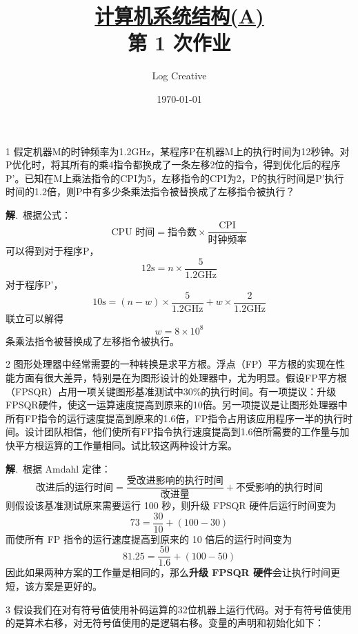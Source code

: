 \documentclass[12pt,a4paper]{article}
\newenvironment{problems}{\begin{list}{}{\renewcommand{\makelabel}[1]{\textbf{##1}.\hfil}}}{\end{list}}
\providecommand{\sol}{\textbf{解}.~}
\begin{document}
\title{\normalsize \underline{计算机系统结构(A)}\\\LARGE 第 1 次作业}
\author{Log Creative }
\date{\today}
\maketitle

\begin{problems}
    \item[1] 假定机器M的时钟频率为1.2GHz，某程序P在机器M上的执行时间为12秒钟。对P优化时，将其所有的乘4指令都换成了一条左移2位的指令，得到优化后的程序P'。已知在M上乘法指令的CPI为5，左移指令的CPI为2，P的执行时间是P'执行时间的1.2倍，则P中有多少条乘法指令被替换成了左移指令被执行？
     
    \sol 根据公式：
    \begin{equation*}
        \text{CPU 时间} = \text{指令数}\times\frac{\text{CPI}}{\text{时钟频率}}
    \end{equation*}
    可以得到对于程序P，
    \begin{equation*}
        12\text{s} = n \times \frac{5}{\text{1.2GHz}}
    \end{equation*}
    对于程序P'，
    \begin{equation*}
        10\text{s} = (n - w) \times \frac{5}{\text{1.2GHz}} + w\times \frac{2}{\text{1.2GHz}}
    \end{equation*}
    联立可以解得
    \begin{equation*}
        w = 8\times 10^8
    \end{equation*}
    条乘法指令被替换成了左移指令被执行。
    \item[2] 图形处理器中经常需要的一种转换是求平方根。浮点（FP）平方根的实现在性能方面有很大差异，特别是在为图形设计的处理器中，尤为明显。假设FP平方根（FPSQR）占用一项关键图形基准测试中30\%的执行时间。有一项提议：升级FPSQR硬件，使这一运算速度提高到原来的10倍。另一项提议是让图形处理器中所有FP指令的运行速度提高到原来的1.6倍，FP指令占用该应用程序一半的执行时间。设计团队相信，他们使所有FP指令执行速度提高到1.6倍所需要的工作量与加快平方根运算的工作量相同。试比较这两种设计方案。
    
    \sol 根据 Amdahl 定律：
    \begin{equation*}
        \text{改进后的运行时间} = \frac{\text{受改进影响的执行时间}}{\text{改进量}} + \text{不受影响的执行时间} 
    \end{equation*}
    则假设该基准测试原来需要运行 100 秒，则升级 FPSQR 硬件后运行时间变为
    \begin{equation*}
        73 = \frac{30}{10} + (100 - 30)
    \end{equation*}
    而使所有 FP 指令的运行速度提高到原来的 10 倍后的运行时间变为
    \begin{equation*}
        81.25 = \frac{50}{1.6} + (100 - 50)
    \end{equation*}
    因此如果两种方案的工作量是相同的，那么\textbf{升级 FPSQR 硬件}会让执行时间更短，该方案是更好的。
    \item[3] 假设我们在对有符号值使用补码运算的32位机器上运行代码。对于有符号值使用的是算术右移，对无符号值使用的是逻辑右移。变量的声明和初始化如下：
     

\end{problems}
\end{document}
